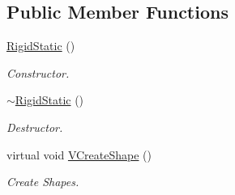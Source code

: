 \subsection*{Public Member Functions}
\begin{DoxyCompactItemize}
\item 
\hypertarget{classContent_1_1Actor_1_1Admin_1_1RigidStatic_af9a84548274ef25602c7725d7e2311b0}{
\hyperlink{classContent_1_1Actor_1_1Admin_1_1RigidStatic_af9a84548274ef25602c7725d7e2311b0}{RigidStatic} ()}
\label{classContent_1_1Actor_1_1Admin_1_1RigidStatic_af9a84548274ef25602c7725d7e2311b0}

\begin{DoxyCompactList}\small\item\em Constructor. \item\end{DoxyCompactList}\item 
\hypertarget{classContent_1_1Actor_1_1Admin_1_1RigidStatic_ae87793982d24bb4053d13f4398a928c7}{
\hyperlink{classContent_1_1Actor_1_1Admin_1_1RigidStatic_ae87793982d24bb4053d13f4398a928c7}{$\sim$RigidStatic} ()}
\label{classContent_1_1Actor_1_1Admin_1_1RigidStatic_ae87793982d24bb4053d13f4398a928c7}

\begin{DoxyCompactList}\small\item\em Destructor. \item\end{DoxyCompactList}\item 
\hypertarget{classContent_1_1Actor_1_1Admin_1_1RigidStatic_a664e96828f68584fbe47b77b606634f5}{
virtual void \hyperlink{classContent_1_1Actor_1_1Admin_1_1RigidStatic_a664e96828f68584fbe47b77b606634f5}{VCreateShape} ()}
\label{classContent_1_1Actor_1_1Admin_1_1RigidStatic_a664e96828f68584fbe47b77b606634f5}

\begin{DoxyCompactList}\small\item\em Create Shapes. \item\end{DoxyCompactList}\end{DoxyCompactItemize}
